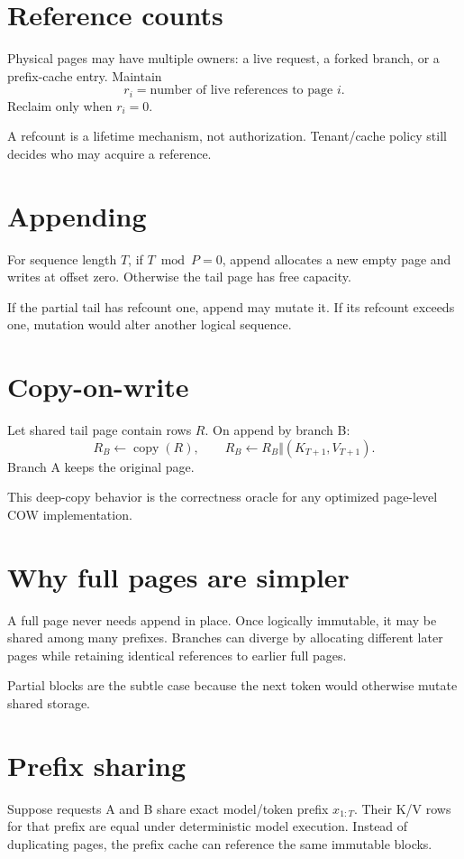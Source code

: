 \section{Reference counts}
Physical pages may have multiple owners: a live request, a forked branch, or a prefix-cache entry. Maintain
\[
r_i=\text{number of live references to page }i.
\]
Reclaim only when $r_i=0$.

A refcount is a lifetime mechanism, not authorization. Tenant/cache policy still decides who may acquire a reference.

\section{Appending}
For sequence length $T$, if $T\bmod P=0$, append allocates a new empty page and writes at offset zero. Otherwise the tail page has free capacity.

If the partial tail has refcount one, append may mutate it. If its refcount exceeds one, mutation would alter another logical sequence.

\section{Copy-on-write}
Let shared tail page contain rows $R$. On append by branch B:
\[
R_B\leftarrow \operatorname{copy}(R),\qquad
R_B\leftarrow R_B\Vert (K_{T+1},V_{T+1}).
\]
Branch A keeps the original page.

This deep-copy behavior is the correctness oracle for any optimized page-level COW implementation.

\section{Why full pages are simpler}
A full page never needs append in place. Once logically immutable, it may be shared among many prefixes. Branches can diverge by allocating different later pages while retaining identical references to earlier full pages.

Partial blocks are the subtle case because the next token would otherwise mutate shared storage.

\section{Prefix sharing}
Suppose requests A and B share exact model/token prefix $x_{1:T}$. Their K/V rows for that prefix are equal under deterministic model execution. Instead of duplicating pages, the prefix cache can reference the same immutable blocks.

